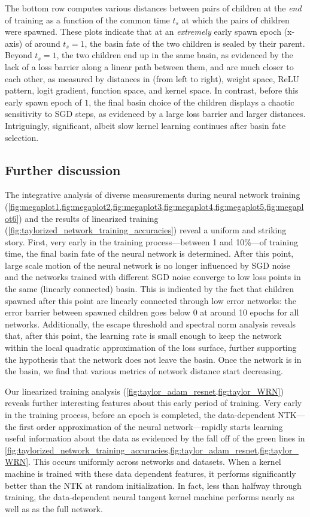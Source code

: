 \documentclass{article}
\begin{document}
The bottom row computes various distances between pairs of children at the \emph{end} of training as a function of the common time $t_s$ at which the pairs of children were spawned.  
These plots indicate that at an \emph{extremely} early spawn epoch (x-axis) of around $t_s=1$, the basin fate of the two children is sealed by their parent. 
Beyond $t_s=1$, the two children end up in the same basin, as evidenced by the lack of a loss barrier along a linear path between them, and are much closer to each other, as measured by distances in (from left to right), weight space, ReLU pattern, logit gradient, function space, and kernel space. 
In contrast, before this early spawn epoch of $1$, the final basin choice of the children displays a chaotic sensitivity to SGD  steps, as evidenced by a large loss barrier and larger distances. 
Intriguingly, significant, albeit slow kernel learning continues after basin fate selection.   

\subsection{Further discussion}

The integrative analysis of diverse measurements during neural network training (\cref{fig:megaplot1,fig:megaplot2,fig:megaplot3,fig:megaplot4,fig:megaplot5,fig:megaplot6}) and the results of linearized training (\cref{fig:taylorized_network_training_accuracies}) reveal a uniform and striking story. 
First, very early in the training process---between 1 and 10\%---of training time, the final basin fate of the neural network is determined. 
After this point, large scale motion of the neural network is no longer influenced by SGD noise and the networks trained with different SGD noise converge to low loss points in the same (linearly connected) basin. 
This is indicated by the fact that children spawned after this point are linearly connected through low error networks: the error barrier between spawned children goes below 0 at around 10 epochs for all networks. 
Additionally, the escape threshold and spectral norm analysis reveals that, after this point, the learning rate is small enough to keep the network within the local quadratic approximation of the loss surface, further supporting the hypothesis that the network does not leave the basin. 
Once the network is in the basin, we find that various metrics of network distance start decreasing. 

Our linearized training analysis (\cref{fig:taylor_adam_resnet,fig:taylor_WRN}) reveals further interesting features about this early period of training. 
Very early in the training process, before an epoch is completed, the data-dependent NTK---the first order approximation of the neural network---rapidly starts learning useful information about the data as evidenced by the fall off of the green lines in \cref{fig:taylorized_network_training_accuracies,fig:taylor_adam_resnet,fig:taylor_WRN}. 
This occurs uniformly across networks and datasets. 
When a kernel machine is trained with these data dependent features, it performs significantly better than the NTK at random initialization. 
In fact, less than halfway through training, the data-dependent neural tangent kernel machine performs nearly as well as as the full network. 
\end{document}
